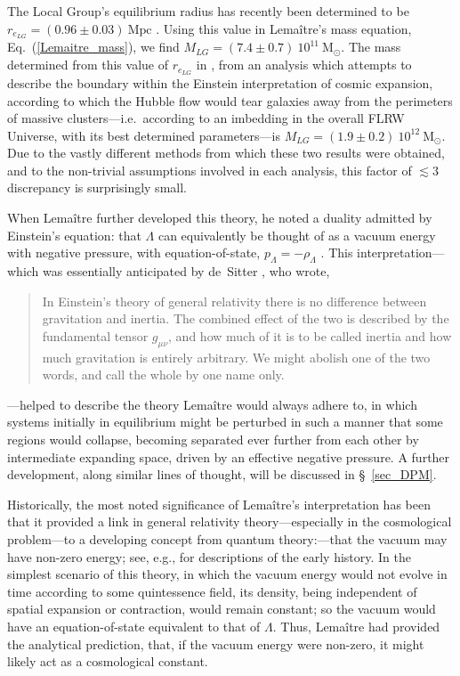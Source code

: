 The Local Group's equilibrium radius has recently been determined to be $r_{e_{LG}}=(0.96\pm0.03)~\mathrm{Mpc}$ \cite{Karachentsev2009}. Using this value in Lema\^{i}tre's mass equation, Eq.~(\ref{Lemaitre_mass}), we find $M_{LG}=(7.4\pm0.7)~10^{11}~\mathrm{M_{\odot}}$. The mass determined from this value of $r_{e_{LG}}$ in \cite{Karachentsev2009}, from an analysis which attempts to describe the boundary within the Einstein interpretation of cosmic expansion, according to which the Hubble flow would tear galaxies away from the perimeters of massive clusters---i.e.~according to an imbedding in the overall FLRW Universe, with its best determined parameters---is $M_{LG}=(1.9\pm0.2)~10^{12}~\mathrm{M_{\odot}}$.  Due to the vastly different methods from which these two results were obtained, and to the non-trivial assumptions involved in each analysis, this factor of $\lesssim3$ discrepancy is surprisingly small.

When Lema\^{i}tre further developed this theory, he noted a duality admitted by Einstein's equation: that $\Lambda$ can equivalently be thought of as a vacuum energy with negative pressure, with equation-of-state, $p_{\Lambda}=-\rho_{\Lambda}$ \cite{Lemaitre1934}. This interpretation---which was essentially anticipated by de~Sitter \cite{deSitter1917}, who wrote,
\begin{quote} 
In Einstein's theory of general relativity there is no difference between gravitation and inertia. The combined effect of the two is described by the fundamental tensor $g_{\mu\nu}$, and how much of it is to be called inertia and how much gravitation is entirely arbitrary. We might abolish one of the two words, and call the whole by one name only.
\end{quote} 
---helped to describe the theory Lema\^{i}tre would always adhere to, in which systems initially in equilibrium might be perturbed in such a manner that some regions would collapse, becoming separated ever further from each other by intermediate expanding space, driven by an effective negative pressure. A further development, along similar lines of thought, will be discussed in \S~\ref{sec_DPM}.

Historically, the most noted significance of Lema\^{i}tre's interpretation has been that it provided a link in general relativity theory---especially in the cosmological problem---to a developing concept from quantum theory:---that the vacuum may have non-zero energy; see, e.g., \cite{Rugh2002,Padmanabhan2003} for descriptions of the early history. In the simplest scenario of this theory, in which the vacuum energy would not evolve in time according to some quintessence field, its density, being independent of spatial expansion or contraction, would remain constant; so the vacuum would have an equation-of-state equivalent to that of $\Lambda$. Thus, Lema\^{i}tre had provided the analytical prediction, that, if the vacuum energy were non-zero, it might likely act as a cosmological constant.


